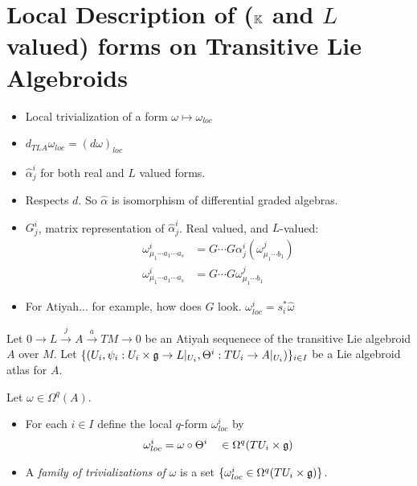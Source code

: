 \section{Local Description of ($\mathbb{K}$ and $L$ valued) forms on Transitive Lie Algebroids}

\begin{itemize}
    
\item Local trivialization of a form $\omega \mapsto \omega_{loc}$

\item $d_{TLA}\omega_{loc} = (d \omega)_{loc}$

\item $\hat \alpha^i_j$ for both real and $L$ valued forms.

\item Respects $d$. So $\hat \alpha$ is isomorphism of differential graded algebras.

\item $G^i_j$, matrix representation of $\hat \alpha^i_j$. Real valued, and $L$-valued:
    \begin{align}
        \omega^i_{\mu_1 \cdots a_1 \cdots a_s} &= G\cdots G \alpha^i_j(\omega^j_{\mu_1 \cdots b_1}) \\
        \omega^i_{\mu_1 \cdots a_1 \cdots a_s} &= G\cdots G \omega^j_{\mu_1 \cdots b_1}
    \end{align}

\item For Atiyah... for example, how does $G$ look. $\omega^i_{loc} = s_i^* \hat \omega$
    
\end{itemize}



Let $0 \to L \xrightarrow{j} A \xrightarrow{a} TM \to 0$ be an Atiyah sequenece of the transitive Lie algebroid $A$ over $M$. Let $\{(U_i, \psi_i: U_i \times \mathfrak{g} \to L|_{U_i}, \Theta^i: TU_i \to A|_{U_i})\}_{i \in I}$ be a Lie algebroid atlas for $A$.

\begin{definition}
Let $\omega \in \Omega^q(A)$.
    \begin{itemize}
    
    \item For each $i \in I$ define the local $q$-form $\omega^i_{loc}$ by
    \begin{align}
        \omega^i_{loc} = \omega \circ \Theta^i  \quad \in \Omega^q(TU_i\times \mathfrak{g})
    \end{align}
    
    \item A \emph{family of trivializations of $\omega$} is a set $\{\omega^i_{loc} \in \Omega^q(TU_i \times \mathfrak{g})\}$.
    
    \end{itemize}

\end{definition}

